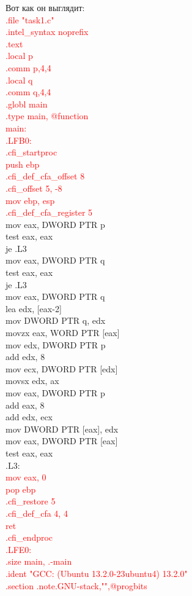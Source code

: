 \documentclass[12pt, letterpaper]{article}
\begin{document}
Вот как он выглядит:\\
\textcolor{red}{
    .file	"task1.c"\\
	\indent .intel\_syntax noprefix\\
	\indent .text\\
	\indent .local	p\\
	\indent .comm	p,4,4\\
	\indent .local	q\\
	\indent .comm	q,4,4\\
	\indent .globl	main\\
	\indent .type	main, @function\\
main:\\
.LFB0:\\
	\indent .cfi\_startproc\\
	\indent push	ebp\\
	\indent .cfi\_def\_cfa\_offset 8\\
	\indent .cfi\_offset 5, -8\\
	\indent mov	ebp, esp\\
	\indent .cfi\_def\_cfa\_register 5}\\
	\indent mov	eax, DWORD PTR p\\
	\indent test	eax, eax\\
	\indent je	.L3\\
	\indent mov	eax, DWORD PTR q\\
	\indent test	eax, eax\\
	\indent je	.L3\\
	\indent mov	eax, DWORD PTR q\\
	\indent lea	edx, [eax-2]\\
	\indent mov	DWORD PTR q, edx\\
	\indent movzx	eax, WORD PTR [eax]\\
	\indent mov	edx, DWORD PTR p\\
	\indent add	edx, 8\\
	\indent mov	ecx, DWORD PTR [edx]\\
	\indent movsx	edx, ax\\
	\indent mov	eax, DWORD PTR p\\
	\indent add	eax, 8\\
	\indent add	edx, ecx\\
	\indent mov	DWORD PTR [eax], edx\\
	\indent mov	eax, DWORD PTR [eax]\\
	\indent test	eax, eax\\
.L3:\\
\textcolor{red}{
	\indent mov	eax, 0\\
	\indent pop	ebp\\
	\indent .cfi\_restore 5\\
	\indent .cfi\_def\_cfa 4, 4\\
	\indent ret\\
	\indent .cfi\_endproc\\
.LFE0:\\
	\indent .size	main, .-main\\
	\indent .ident	"GCC: (Ubuntu 13.2.0-23ubuntu4) 13.2.0"\\
	\indent .section	.note.GNU-stack,"",@progbits}\\
\end{document}
